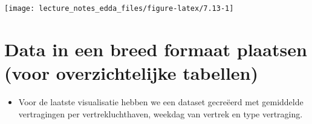 \documentclass[]{memoir}
\providecommand{\tightlist}{%
  \setlength{\itemsep}{0pt}\setlength{\parskip}{0pt}}
\begin{document}
\texttt{[image: lecture\_notes\_edda\_files/figure-latex/7.13-1]}

\hypertarget{data-in-een-breed-formaat-plaatsen-voor-overzichtelijke-tabellen}{%
\section{Data in een breed formaat plaatsen (voor overzichtelijke tabellen)}\label{data-in-een-breed-formaat-plaatsen-voor-overzichtelijke-tabellen}}

\begin{itemize}
\tightlist
\item
  Voor de laatste visualisatie hebben we een dataset gecreëerd met gemiddelde vertragingen per vertrekluchthaven, weekdag van vertrek en type vertraging.
\end{itemize}
\end{document}
